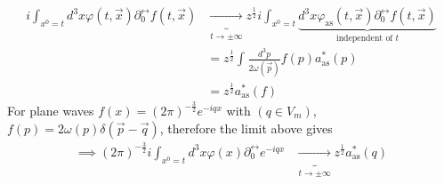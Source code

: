 \documentclass{report}
\begin{document}
\begin{align*}
  i \int_{x^{0} = t}^{} d^3x \varphi\left( t, \vec{x} \right) \partial_0^{\leftrightarrow} f\left( t, \vec{x} \right) &\underbrace{\to }_{t \to \pm \infty} z^{\frac{1}{2} } i \int_{x^{0} = t}^{} \underbrace{d^3x \varphi_{\text{as}} \left( t, \vec{x} \right) \partial_0^{\leftrightarrow} f\left( t, \vec{x} \right)  }_{\text{independent of $t$}}  \\
  &= z^{\frac{1}{2} } \int_{}^{} \frac{d^3p}{2 \omega\left( \vec{p} \right) } f\left( p \right) a_{\text{as}} ^{*} \left( p \right)   \\
  &= z^{\frac{1}{2} } a_{\text{as}} ^{*} \left( f \right) 
\end{align*}
For plane waves $f\left( x \right) = \left( 2\pi \right) ^{-\frac{3}{2} } e^{-iqx} $ with $\left( q \in V_m \right) $, $f\left( p \right) = 2 \omega\left( p \right) \delta\left( \vec{p} - \vec{q} \right) $, therefore the limit above gives
\begin{align*}
  \implies \left( 2\pi \right) ^{-\frac{3}{2} } i \int_{x^{0} = t}^{} d^3x \varphi\left( x \right) \partial_0^{\leftrightarrow} e^{-iqx} &\underbrace{\to }_{t \to \pm\infty} z^{\frac{1}{2} } a_{\text{as}} ^{*} \left( q \right)   
\end{align*}
\end{document}
